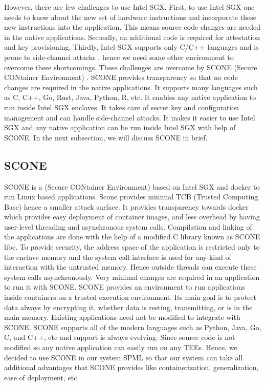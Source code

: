 However, there are few challenges to use Intel SGX. First, to use Intel SGX one needs to know about the new set of hardware instructions and incorporate these new instructions into the application. This means source code changes are needed in the native applications. Secondly, an additional code is required for attestation and key provisioning. Thirdly, Intel SGX supports only C/C++ languages and is prone to side-channel attacks \cite{74}, hence we need some other environment to overcome these shortcomings. These challenges are overcome by SCONE (Secure CONtainer Environment) \cite{22}. SCONE provides transparency so that no code changes are required in the native applications. It supports many languages such as C, C++, Go, Rust, Java, Python, R, etc. It enables any native application to run inside Intel SGX enclaves. It takes care of secret key and configuration management and can handle side-channel attacks. It makes it easier to use Intel SGX and any native application can be run inside Intel SGX with help of SCONE. In the next subsection, we will discuss SCONE in brief.

\subsection{SCONE}
SCONE is a (Secure CONtainer Environment) \cite{22} based on Intel SGX and docker to run Linux based applications. Scone provides minimal TCB (Trusted Computing Base) hence a smaller attack surface. It provides transparency towards docker which provides easy deployment of container images, and less overhead by having user-level threading and asynchronous system calls. Compilation and linking of the applications are done with the help of a modified C library known as SCONE libc. To provide security, the address space of the application is restricted only to the enclave memory and the system call interface is used for any kind of interaction with the untrusted memory. Hence outside threads can execute these system calls asynchronously. Very minimal changes are required in an application to run it with SCONE. SCONE provides an environment to run applications inside containers on a trusted execution environment. Its main goal is to protect data always by encrypting it, whether data is resting, transmitting, or is in the main memory. Existing applications need not be modified to integrate with SCONE. SCONE supports all of the modern languages such as Python, Java, Go, C, and C++, etc and support is always evolving. Since source code is not modified so any native application can easily run on any TEEs. Hence, we decided to use SCONE in our system SPML so that our system can take all additional advantages that SCONE provides like containerization, generalization, ease of deployment, etc.


